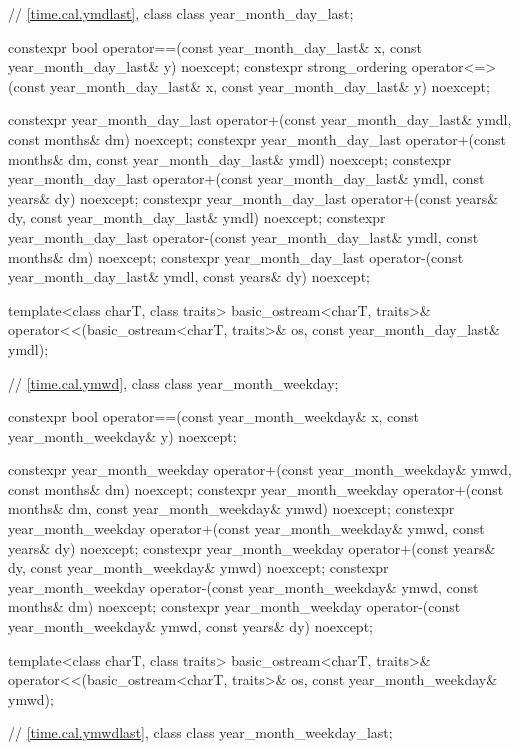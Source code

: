 \begin{codeblock}
{  // \ref{time.cal.ymdlast}, class 
  class year_month_day_last;

  constexpr bool operator==(const year_month_day_last& x,
                            const year_month_day_last& y) noexcept;
  constexpr strong_ordering operator<=>(const year_month_day_last& x,
                                        const year_month_day_last& y) noexcept;

  constexpr year_month_day_last
    operator+(const year_month_day_last& ymdl, const months& dm) noexcept;
  constexpr year_month_day_last
    operator+(const months& dm, const year_month_day_last& ymdl) noexcept;
  constexpr year_month_day_last
    operator+(const year_month_day_last& ymdl, const years& dy) noexcept;
  constexpr year_month_day_last
    operator+(const years& dy, const year_month_day_last& ymdl) noexcept;
  constexpr year_month_day_last
    operator-(const year_month_day_last& ymdl, const months& dm) noexcept;
  constexpr year_month_day_last
    operator-(const year_month_day_last& ymdl, const years& dy) noexcept;

  template<class charT, class traits>
    basic_ostream<charT, traits>&
      operator<<(basic_ostream<charT, traits>& os, const year_month_day_last& ymdl);

  // \ref{time.cal.ymwd}, class 
  class year_month_weekday;

  constexpr bool operator==(const year_month_weekday& x,
                            const year_month_weekday& y) noexcept;

  constexpr year_month_weekday
    operator+(const year_month_weekday& ymwd, const months& dm) noexcept;
  constexpr year_month_weekday
    operator+(const months& dm, const year_month_weekday& ymwd) noexcept;
  constexpr year_month_weekday
    operator+(const year_month_weekday& ymwd, const years& dy) noexcept;
  constexpr year_month_weekday
    operator+(const years& dy, const year_month_weekday& ymwd) noexcept;
  constexpr year_month_weekday
    operator-(const year_month_weekday& ymwd, const months& dm) noexcept;
  constexpr year_month_weekday
    operator-(const year_month_weekday& ymwd, const years& dy) noexcept;

  template<class charT, class traits>
    basic_ostream<charT, traits>&
      operator<<(basic_ostream<charT, traits>& os, const year_month_weekday& ymwd);

  // \ref{time.cal.ymwdlast}, class 
  class year_month_weekday_last;

}
\end{codeblock}
